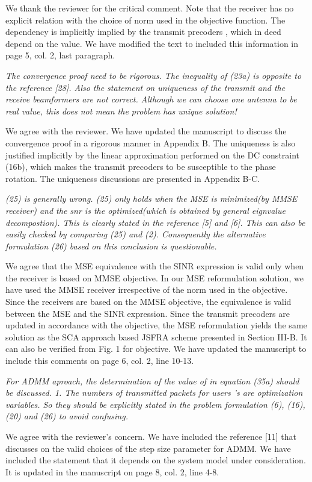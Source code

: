 \begin{itemize}
\resp We thank the reviewer for the critical comment. Note that the receiver has no explicit relation with the choice of  norm used in the objective function. The dependency is implicitly implied by the transmit precoders , which in deed depend on the  value. We have modified the text to included this information in page 5, col. 2, last paragraph.

 \textit{The convergence proof need to be rigorous. The inequality of (23a) is opposite to the reference [28]. Also the statement on uniqueness of the transmit and the receive beamformers are not correct. Although we can choose one antenna to be real value, this does not mean the problem has unique solution!}

\resp We agree with the reviewer. We have updated the manuscript to discuss the convergence proof in a rigorous manner in Appendix B. The uniqueness is also justified implicitly by the linear approximation performed on the DC constraint (16b), which makes the transmit precoders to be susceptible to the phase rotation. The uniqueness discussions are presented in Appendix B-C.

 \textit{(25) is generally wrong. (25) only holds when the MSE is minimized(by MMSE receiver) and the snr is the optimized(which is obtained by general eignvalue decompostion). This is clearly stated in the reference [5] and [6]. This can also be easily checked by comparing (25) and (2). Consequently the alternative formulation (26) based on this conclusion is questionable.}

\resp We agree that the MSE equivalence with the SINR expression is valid only when the receiver is based on MMSE objective. In our MSE reformulation solution, we have used the MMSE receiver irrespective of the  norm used in the objective. Since the receivers are based on the MMSE objective, the equivalence is valid between the MSE and the SINR expression. Since the transmit precoders are updated in accordance with the objective, the MSE reformulation yields the same solution as the SCA approach based JSFRA scheme presented in Section III-B. It can also be verified from Fig. 1 for  objective. We have updated the manuscript to include this comments on page 6, col. 2, line 10-13.

 \textit{For ADMM aproach, the determination of the value of \me{\rho} in equation (35a) should be discussed. 1. The numbers of transmitted packets for users  's are optimization variables. So they should be explicitly stated in the problem formulation (6), (16), (20) and (26) to avoid confusing.}

\resp We agree with the reviewer's concern. We have included the reference [11] that discusses on the valid choices of the step size parameter for ADMM. We have included the statement that it depends on the system model under consideration. It is updated in the manuscript on page 8, col. 2, line 4-8.

\end{itemize}

